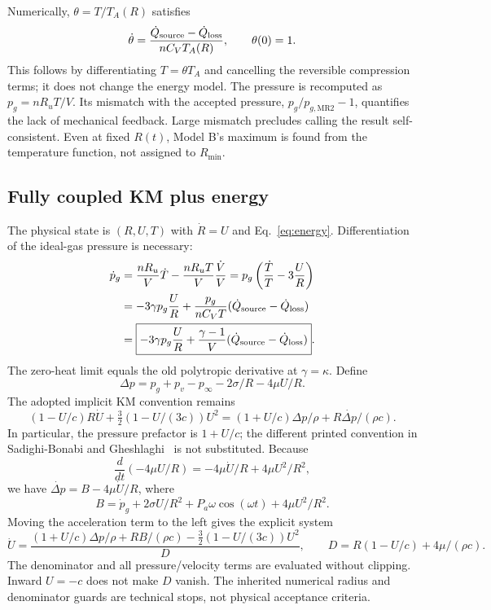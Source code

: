 \documentclass[10pt,a4paper]{article}
\begin{document}
Numerically, $\theta=T/T_A(R)$ satisfies
\begin{equation}
\dot\theta=\frac{\dot Q_{\rm source}-\dot Q_{\rm loss}}{nC_VT_A(R)},\qquad\theta(0)=1.
\end{equation}
This follows by differentiating $T=\theta T_A$ and cancelling the reversible compression terms; it does not change the energy model. The pressure is recomputed as $p_g=nR_uT/V$. Its mismatch with the accepted pressure,
$p_g/p_{g,\mathrm{MR2}}-1$, quantifies the lack of mechanical feedback. Large mismatch precludes calling the result self-consistent. Even at fixed $R(t)$, Model B's maximum is found from the temperature function, not assigned to $R_{\min}$.

\subsection{Fully coupled KM plus energy}
The physical state is $(R,U,T)$ with $\dot R=U$ and Eq.~\eqref{eq:energy}. Differentiation of the ideal-gas pressure is necessary:
\begin{align}
\dot p_g&=\frac{nR_u}{V}\dot T-\frac{nR_uT}{V}\frac{\dot V}{V}
=p_g\left(\frac{\dot T}{T}-3\frac{U}{R}\right)\\
&=-3\gamma p_g\frac{U}{R}+
\frac{p_g}{nC_VT}(\dot Q_{\rm source}-\dot Q_{\rm loss})\\
&=\boxed{-3\gamma p_g\frac{U}{R}+\frac{\gamma-1}{V}
(\dot Q_{\rm source}-\dot Q_{\rm loss})}.\label{eq:dpg}
\end{align}
The zero-heat limit equals the old polytropic derivative at $\gamma=\kappa$. Define
\[
\Delta p=p_g+p_v-p_\infty-2\sigma/R-4\mu U/R.
\]
The adopted implicit KM convention remains
\begin{equation}
(1-U/c)R\dot U+\tfrac32(1-U/(3c))U^2
=(1+U/c)\Delta p/\rho+R\dot{\Delta p}/(\rho c).
\end{equation}
In particular, the pressure prefactor is $1+U/c$; the different printed convention in Sadighi-Bonabi and Gheshlaghi~\cite{sadighi} is not substituted. Because
\[
\frac{d}{dt}(-4\mu U/R)=-4\mu\dot U/R+4\mu U^2/R^2,
\]
we have $\dot{\Delta p}=B-4\mu\dot U/R$, where
\[
B=\dot p_g+2\sigma U/R^2+P_a\omega\cos(\omega t)+4\mu U^2/R^2.
\]
Moving the acceleration term to the left gives the explicit system
\begin{equation}
\boxed{\dot U=\frac{(1+U/c)\Delta p/\rho+RB/(\rho c)
-\tfrac32(1-U/(3c))U^2}{D}},\qquad
D=R(1-U/c)+4\mu/(\rho c).
\end{equation}
The denominator and all pressure/velocity terms are evaluated without clipping. Inward $U=-c$ does not make $D$ vanish. The inherited numerical radius and denominator guards are technical stops, not physical acceptance criteria.
\end{document}
